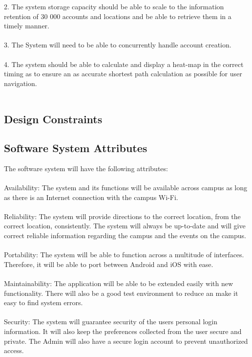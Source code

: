 \documentclass{article}
\begin{document}
{2.	The system storage capacity should be able to scale to the information retention of 30 000 accounts and locations and be able to retrieve them in a timely manner.\\\\
3.	The System will need to be able to concurrently handle account creation.\\\\
4.	The system should be able to calculate and display a heat-map in the correct timing as to ensure an as accurate shortest path calculation as possible for user navigation.\\\\

	}
        \subsection{Design Constraints}
        \subsection{Software System Attributes}
		{		
			The software system will have the following attributes:
\\\\
		Availability: The system and its functions will be available across campus as long as there is an Internet connection with the campus Wi-Fi. 
\\\\
		Reliability: The system will provide directions to the correct location, from the correct location, consistently. The system will always be up-to-date and will give correct reliable information regarding the campus and the events on the campus.
\\\\
		Portability: The system will be able to function across a multitude of interfaces. Therefore, it will be able to port between Android and iOS with ease. 
\\\\
		Maintainability: The application will be able to be extended easily with new functionality. There will also be a good test environment to reduce an make it easy to find system errors.  
\\\\
		Security: The system will guarantee security of the users personal login information. It will also keep the preferences collected from the user secure and private. The Admin will also have a secure login account to prevent unauthorized access.}
\end{document}
